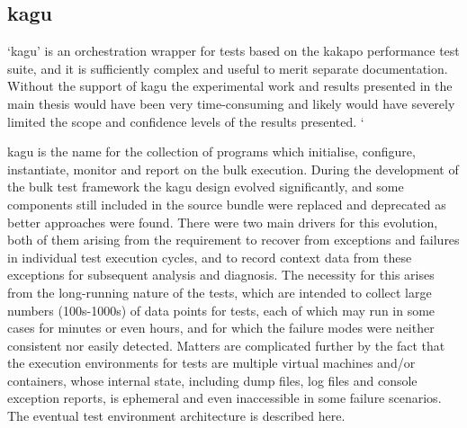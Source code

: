 \subsection{kagu}

 ‘kagu’ is an orchestration wrapper for tests based on the kakapo performance test suite, and it is sufficiently complex and useful to merit separate documentation.  Without the support of kagu the experimental work and results presented in the main thesis would have been very time-consuming and likely would have severely limited the scope and confidence levels of the results presented.  `


kagu is the name for the collection of programs which initialise, configure, instantiate, monitor and report on the bulk execution.  During the development of the bulk test framework the kagu design evolved significantly, and some components still included in the source bundle were replaced and deprecated as better approaches were found.  There were two main drivers for this evolution, both of them arising from the requirement to recover from exceptions and failures in individual test execution cycles, and to record context data from these exceptions for subsequent analysis and diagnosis.  The necessity for this arises from the long-running nature of the tests, which are intended to collect large numbers (100s-1000s) of data points for tests, each of which may run in some cases for  minutes or even hours, and for which the failure modes were neither consistent nor easily detected.  Matters are complicated further by the fact that the execution environments for tests are multiple virtual machines and/or containers, whose internal state, including dump files, log files and console exception reports, is ephemeral and even inaccessible in some failure scenarios.  The eventual test environment architecture is described here.


